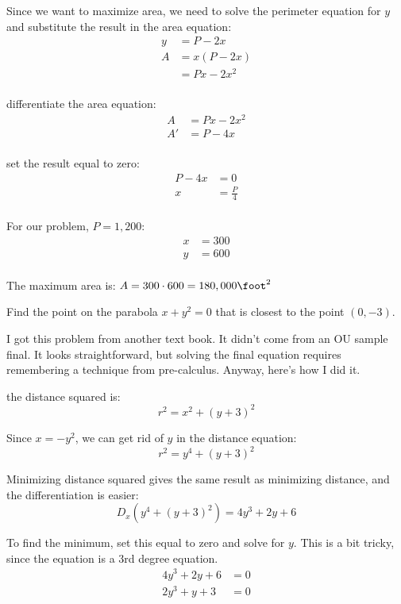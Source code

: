 \documentclass[fleqn,addpoints]{exam}
\begin{document}
\begin{questions}
\begin{solution}
Since we want to maximize area, we need to solve the perimeter equation for $y$ and substitute the result in the area
equation:
\begin{align*}
  y &= P - 2x \\
  A &= x(P - 2x) \\
    &= Px - 2x^2 \\
\end{align*}

differentiate the area equation:
\begin{align*}
  A &= Px - 2x^2 \\
  A' &= P - 4x \\
\end{align*}

set the result equal to zero:
\begin{align*}
  P - 4x &= 0 \\
  x &= \frac{P}{4} \\
\end{align*}

For our problem, $P = 1,200$:
\begin{align*}
  x &= 300 \\
  y &= 600 \\
\end{align*}

The maximum area is: $A = 300 \cdot 600 = 180,000 \foot^2$

\end{solution}

\question
Find the point on the parabola $x + y^2 = 0$ that is closest to the point $(0, -3)$.

\begin{solution}
I got this problem from another text book.  It didn't come from an OU sample final.  It looks straightforward, but
solving the final equation requires remembering a technique from pre-calculus.  Anyway, here's how I did it.

the distance squared is:
\[
  r^2 = x^2 + (y + 3)^2
\]

Since $x = -y^2$, we can get rid of $y$ in the distance equation:
\[
  r^2 = y^4 + (y + 3)^2
\]

Minimizing distance squared gives the same result as minimizing distance, and the differentiation is easier:
\[
  D_x (y^4 + (y + 3)^2) = 4y^3 + 2y + 6
\] 

To find the minimum, set this equal to zero and solve for $y$.  This is a bit tricky, since the equation is a 3rd degree
equation.
\begin{align*}
  4y^3 + 2y + 6 &= 0 \\
  2y^3 + y + 3 &= 0 \\
\end{align*}


\end{solution}
\end{questions}
\end{document}
